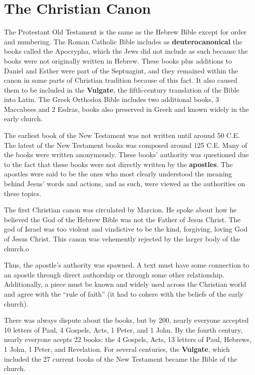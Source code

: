 \documentclass{report}
\begin{document}
        \section{The Christian Canon}
        The Protestant Old Testament is the same as the Hebrew Bible except for order and numbering. The Roman Catholic Bible includes as \textbf{deuterocanonical} the books called the Apocrypha, which the Jews did not include as such because the books were not originally written in Hebrew. These books plus additions to Daniel and Esther were part of the Septuagint, and they remained within the canon in some parts of Christian tradition because of this fact. It also caused them to be included in the \textbf{Vulgate}, the fifth-century translation of the Bible into Latin. The Greek Orthodox Bible includes two additional books, 3 Maccabees and 2 Esdras, books also preserved in Greek and known widely in the early church.

        The earliest book of the New Testament was not written until around 50 C.E. The latest of the New Testament books was composed around 125 C.E. Many of the books were written anonymously. These books' authority was questioned due to the fact that these books were not directly written by the \textbf{apostles}. The apostles were said to be the ones who most clearly understood the meaning behind Jesus' words and actions, and as such, were viewed as the authorities on these topics.

        The first Christian canon was circulated by Marcion. He spoke about how he believed the God of the Hebrew Bible was not the Father of Jesus Christ. The god of Israel was too violent and vindictive to be the kind, forgiving, loving God of Jesus Christ. This canon was vehemently rejected by the larger body of the church.o

        Thus, the apostle's authority was spawned. A text must have some connection to an apostle through direct authorship or through some other relationship. Additionally, a piece must be known and widely used across the Christian world and agree with the ``rule of faith'' (it had to cohere with the beliefs of the early church).

        There was always dispute about the books, but by 200, nearly everyone accepted 10 letters of Paul, 4 Gospels, Acts, 1 Peter, and 1 John. By the fourth century, nearly everyone acepts 22 books: the 4 Gospels, Acts, 13 letters of Paul, Hebrews, 1 John, 1 Peter, and Revelation. For several centuries, the \textbf{Vulgate}, which included the 27 current books of the New Testament became the Bible of the church.
\end{document}
